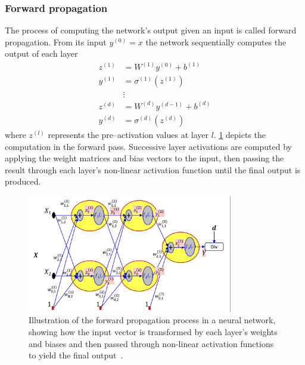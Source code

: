         \subsubsection{Forward propagation}
            The process of computing the network's output given an input is called forward propagation.
            From its input \(y^{(0)} = x\) the network sequentially computes the output of each layer
            \begin{align}
                z^{(1)} &= W^{(1)}y^{(0)} + b^{(1)} \\
                y^{(1)} &= \sigma^{(1)}(z^{(1)}) \\
                &\nonumber \vdots \\
                z^{(d)} &= W^{(d)}y^{(d-1)} + b^{(d)} \\
                y^{(d)} &= \sigma^{(d)}(z^{(d)})
            \end{align}
            where \(z^{(l)}\) represents the pre--activation values at layer \(l\).
            \cref{fig:forward-pass} depicts the computation in the forward pass.
            Successive layer activations are computed by applying the weight matrices and bias vectors to the input, then passing the result through each layer's non-linear activation function until the final output is produced.
            \begin{figure}
                  \centering
                  \includegraphics[width=0.8\textwidth]{figures/chapter-03/forwardpass.png}
                  \caption[Forward pass]{Illustration of the forward propagation process in a neural network, showing how the input vector is transformed by each layer's weights and biases and then passed through non-linear activation functions to yield the final output~\cite{noauthor_idl_nodate}.}
                  \label{fig:forward-pass}
            \end{figure}
